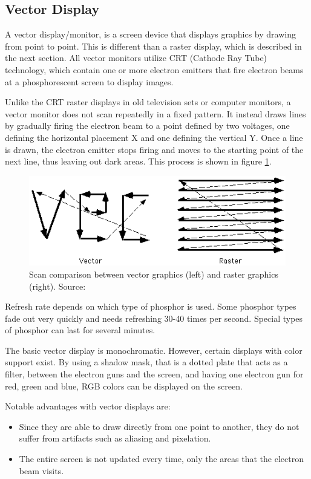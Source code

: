 \subsection{Vector Display}
A vector display/monitor, is a screen device that displays graphics by drawing from point to point. This is different than a raster display, which is described in the next section.
All vector monitors utilize CRT (Cathode Ray Tube) technology, which contain one or more electron emitters that fire electron beams at a phosphorescent screen to display images.

Unlike the CRT raster displays in old television sets or computer monitors, a vector monitor does not scan repeatedly in a fixed pattern. It instead draws lines by gradually firing the electron beam to a point defined by two voltages, one defining the horizontal placement X and one defining the vertical Y. Once a line is drawn, the electron emitter stops firing and moves to the starting point of the next line, thus leaving out dark areas. This process is shown in figure \ref{fig:vectorscan}.

\begin{figure}[h!]
\centering \includegraphics[width=0.8\linewidth]{images/scan.png}
\caption{Scan comparison between vector graphics (left) and raster graphics (right). Source: \cite{vecvsras}}
\label{fig:vectorscan}
\end{figure}

Refresh rate depends on which type of phosphor is used. Some phosphor types fade out very quickly and needs refreshing 30-40 times per second. Special types of phosphor can last for several minutes.

The basic vector display is monochromatic. However, certain displays with color support exist. By using a shadow mask, that is a dotted plate that acts as a filter, between the electron guns and the screen, and having one electron gun for red, green and blue, RGB colors can be displayed on the screen.

Notable advantages with vector displays are:
\begin{itemize}
\item Since they are able to draw directly from one point to another, they do not suffer from artifacts such as aliasing and pixelation.
\item The entire screen is not updated every time, only the areas that the electron beam visits.
\end{itemize}

